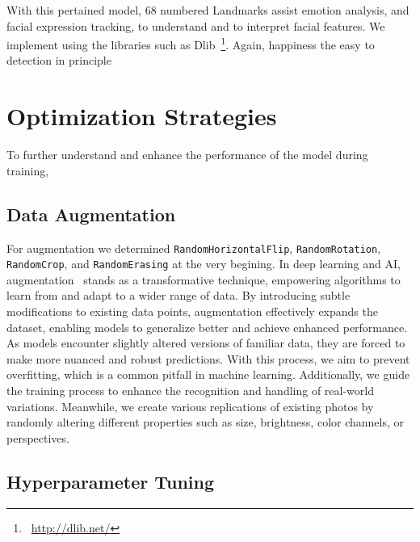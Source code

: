 With this pertained model, 68 numbered Landmarks assist emotion analysis, 
and facial expression tracking, to understand and to interpret facial features.
We implement using the libraries such as Dlib~\footnote{~\url{http://dlib.net/}}. %
Again,  happiness the easy to detection in principle 



\section{Optimization Strategies}
\label{sec:optim}

To further understand and enhance the performance of the model during training, 

\subsection{Data Augmentation}
\label{sec:optim:aug}

For augmentation we determined \texttt{RandomHorizontalFlip}, \texttt{RandomRotation}, 
\texttt{RandomCrop}, and \texttt{RandomErasing} at the very begining. 
In deep learning and AI, 
augmentation~\cite{augment} stands as a transformative technique, 
empowering algorithms to learn from and adapt to a wider range of data. 
By introducing subtle modifications to existing data points, 
augmentation effectively expands the dataset, 
enabling models to generalize better and achieve enhanced performance. 
As models encounter slightly altered versions of familiar data, 
they are forced to make more nuanced and robust predictions. 
With this process, we aim to prevent overfitting, which is a common pitfall in machine learning. 
Additionally, we guide the training process to enhance the recognition and handling of real-world variations.
Meanwhile, we create various replications of existing photos by randomly altering different properties such as size, brightness, color channels, or perspectives.

\subsection{Hyperparameter Tuning}
\label{sec:optim:tuning}

